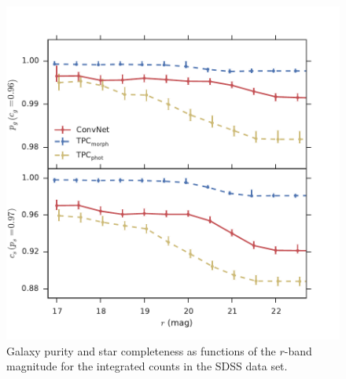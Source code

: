 \documentclass[fleqn,usenatbib]{mnras}
\begin{document}
\begin{figure}
  \centering
  \includegraphics[width=\columnwidth]{figures/sdss_integrated.pdf}
  \caption{Galaxy purity and star completeness as functions of the $r$-band
    magnitude for the integrated counts in the SDSS data set.}
  \label{fig:sdss_integrated}
\end{figure}
\end{document}
